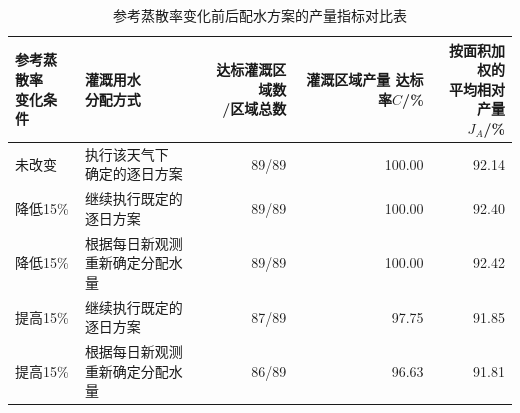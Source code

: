 \begin{table}[H]
 \centering\small
 \caption{参考蒸散率变化前后配水方案的产量指标对比表}
 \label{tab:irrigation89-weather-plan-outcomes}
 \renewcommand{\arraystretch}{1.15}
 \begin{tabular}{llrrr}
 \toprule
 \shortstack{参考蒸散率\\变化条件} & \shortstack{灌溉用水\\分配方式} & \shortstack{达标灌溉区域数\\/区域总数} & \shortstack{灌溉区域产量\\达标率\(C\)/\%} & \shortstack{按面积加权的\\平均相对产量\\\(J_A\)/\%}\\
 \midrule
 未改变 & \shortstack[l]{执行该天气下\\确定的逐日方案} & 89/89 & 100.00 & 92.14\\
 降低15\% & 继续执行既定的逐日方案 & 89/89 & 100.00 & 92.40\\
 降低15\% & \shortstack[l]{根据每日新观测\\重新确定分配水量} & 89/89 & 100.00 & 92.42\\
 提高15\% & 继续执行既定的逐日方案 & 87/89 & 97.75 & 91.85\\
 提高15\% & \shortstack[l]{根据每日新观测\\重新确定分配水量} & 86/89 & 96.63 & 91.81\\
 \bottomrule
 \end{tabular}
\end{table}
